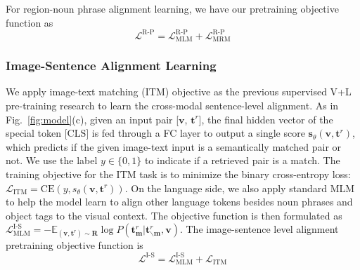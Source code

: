 For region-noun phrase alignment learning, we have our pretraining objective function as 
\begin{equation}\nonumber
\mathcal{L}^{\text{R-P}} =  \mathcal{L}_{\text{MLM}}^{\text{R-P}} + \mathcal{L}_{\text{MRM}}^{\text{R-P}} 
\end{equation}


\subsubsection{Image-Sentence Alignment Learning}
\label{section:itm}
We apply image-text matching (ITM) objective as the previous supervised V+L pre-training research \cite{chen2020uniter,li2020unicoder} to learn the cross-modal sentence-level alignment. 
As in Fig.~\ref{fig:model}(c), given an input pair [$\mathbf v$, $\mathbf t^r$], the final hidden vector of the special token $\text{[CLS]}$ is fed through a FC layer to output a single score $\mathbf s_{\theta}(\mathbf v, \mathbf t^r)$, which predicts if the given image-text input is a semantically matched pair or not. 
We use the label $y\in \{0,1\}$ to indicate if a retrieved pair is a match.
The training objective for the ITM task is to minimize the binary cross-entropy loss:
$
\mathcal{L}_{\text{ITM}} =\mbox{CE}( y ,s_{\theta}(\mathbf{v}, \mathbf{t}^r) ) 
$.
On the language side, we also apply standard MLM to help the model learn to align other language tokens besides noun phrases and object tags to the visual context.
The objective function is then formulated as $\mathcal{L}_{\text{MLM}}^{\text{I-S}} = - \mathbb{E}_{(\mathbf v, \mathbf t^r)\sim \mathbf R} \log{P(\mathbf t^r_{\mathbf m} |\mathbf t^r_{\backslash \mathbf m}, \mathbf v)}$.
The image-sentence level alignment pretraining objective function is
\begin{equation}\nonumber
\mathcal{L}^{\text{I-S}} =  \mathcal{L}_{\text{MLM}}^{\text{I-S}} + \mathcal{L}_{\text{ITM}}
\end{equation}


